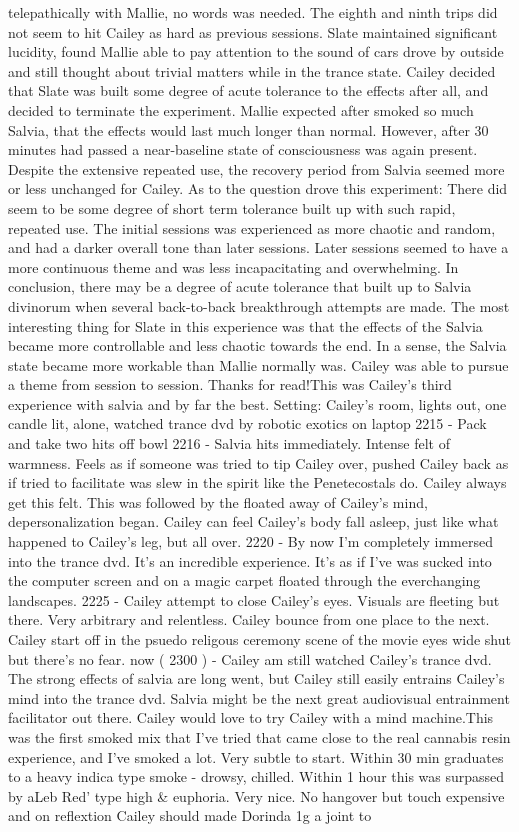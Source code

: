 \documentclass[12pt]{book}
\begin{document}
telepathically with Mallie, no words was needed. The eighth and ninth trips did not seem to hit Cailey as hard as previous sessions. Slate maintained significant lucidity, found Mallie able to pay attention to the sound of cars drove by outside and still thought about trivial matters while in the trance state. Cailey decided that Slate was built some degree of acute tolerance to the effects after all, and decided to terminate the experiment. Mallie expected after smoked so much Salvia, that the effects would last much longer than normal. However, after 30 minutes had passed a near-baseline state of consciousness was again present. Despite the extensive repeated use, the recovery period from Salvia seemed more or less unchanged for Cailey. As to the question drove this experiment: There did seem to be some degree of short term tolerance built up with such rapid, repeated use. The initial sessions was experienced as more chaotic and random, and had a darker overall tone than later sessions. Later sessions seemed to have a more continuous theme and was less incapacitating and overwhelming. In conclusion, there may be a degree of acute tolerance that built up to Salvia divinorum when several back-to-back breakthrough attempts are made. The most interesting thing for Slate in this experience was that the effects of the Salvia became more controllable and less chaotic towards the end. In a sense, the Salvia state became more workable than Mallie normally was. Cailey was able to pursue a theme from session to session. Thanks for read!This was Cailey's third experience with salvia and by far the best. Setting: Cailey's room, lights out, one candle lit, alone, watched trance dvd by robotic exotics on laptop 2215 - Pack and take two hits off bowl 2216 - Salvia hits immediately. Intense felt of warmness. Feels as if someone was tried to tip Cailey over, pushed Cailey back as if tried to facilitate was slew in the spirit like the Penetecostals do. Cailey always get this felt. This was followed by the floated away of Cailey's mind, depersonalization began. Cailey can feel Cailey's body fall asleep, just like what happened to Cailey's leg, but all over. 2220 - By now I'm completely immersed into the trance dvd. It's an incredible experience. It's as if I've was sucked into the computer screen and on a magic carpet floated through the everchanging landscapes. 2225 - Cailey attempt to close Cailey's eyes. Visuals are fleeting but there. Very arbitrary and relentless. Cailey bounce from one place to the next. Cailey start off in the psuedo religous ceremony scene of the movie eyes wide shut but there's no fear. now ( 2300 ) - Cailey am still watched Cailey's trance dvd. The strong effects of salvia are long went, but Cailey still easily entrains Cailey's mind into the trance dvd. Salvia might be the next great audiovisual entrainment facilitator out there. Cailey would love to try Cailey with a mind machine.This was the first smoked mix that I've tried that came close to the real cannabis resin experience, and I've smoked a lot. Very subtle to start. Within 30 min graduates to a heavy indica type smoke - drowsy, chilled. Within 1 hour this was surpassed by aLeb Red' type high \& euphoria. Very nice. No hangover but touch expensive and on reflextion Cailey should made Dorinda 1g a joint to 
\end{document}

